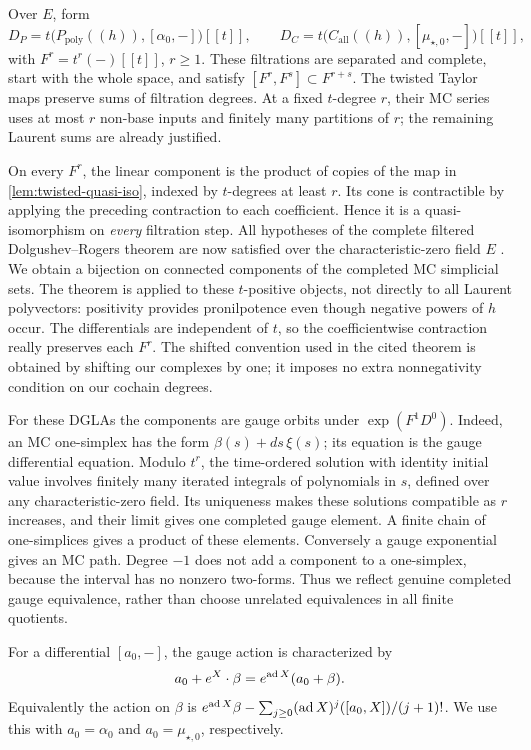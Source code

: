 Over $E$, form
\[
 D_P=t\bigl(P_{\mathrm{poly}}((h)),[\alpha_0,-]\bigr)[[t]],
 \qquad
 D_C=t\bigl(C_{\mathrm{all}}((h)),[\mu_{\star,0},-]\bigr)[[t]],
\]
with $F^r=t^r(-)[[t]]$, $r\ge1$.  These filtrations are separated and
complete, start with the whole space, and satisfy
$[F^r,F^s]\subset F^{r+s}$.  The twisted Taylor maps preserve sums of
filtration degrees.  At a fixed $t$-degree $r$, their MC series uses
at most $r$ non-base inputs and finitely many partitions of $r$;
the remaining Laurent sums are already justified.

On every $F^r$, the linear component is the product of copies of the
map in \cref{lem:twisted-quasi-iso}, indexed by $t$-degrees at least $r$.
Its cone is contractible by applying the preceding contraction to
each coefficient.  Hence it is a quasi-isomorphism on \emph{every}
filtration step.  All hypotheses of the complete filtered
Dolgushev--Rogers theorem are now satisfied over the characteristic-zero
field $E$ \cite[Theorem~2.2]{DolgushevRogers2015}.  We obtain a bijection
on connected components of the completed MC simplicial sets.
The theorem is applied to these $t$-positive objects, not directly to
all Laurent polyvectors: positivity provides pronilpotence even
though negative powers of $h$ occur.  The differentials are
independent of $t$, so the coefficientwise contraction really
preserves each $F^r$.  The shifted convention used in the cited
theorem is obtained by shifting our complexes by one; it imposes no
extra nonnegativity condition on our cochain degrees.

For these DGLAs the components are gauge orbits under
$\exp(F^1D^0)$.  Indeed, an MC one-simplex has the form
$\beta(s)+ds\,\xi(s)$; its equation is the gauge differential equation.
Modulo $t^r$, the time-ordered solution with identity initial value
involves finitely many
iterated integrals of polynomials in $s$, defined over any
characteristic-zero field. Its uniqueness makes these solutions compatible
as $r$ increases, and their limit gives one completed gauge element.
A finite chain of one-simplices gives a product of these elements.
Conversely a gauge
exponential gives an MC path.  Degree $-1$ does not add a component
to a one-simplex, because the interval has no nonzero two-forms.
Thus we reflect genuine completed gauge equivalence, rather than
choose unrelated equivalences in all finite quotients.

For a differential $[a_0,-]$, the gauge action is characterized by
\[
 a_0+e^X\mathbin{\cdot}\beta
   =e^{\operatorname{ad} X}(a_0+\beta).
\]
Equivalently the action on $\beta$ is
$e^{\operatorname{ad} X}\beta-\sum_{j\ge0}(\operatorname{ad} X)^j([a_0,X])/(j+1)!$.
We use this with $a_0=\alpha_0$ and $a_0=\mu_{\star,0}$, respectively.

